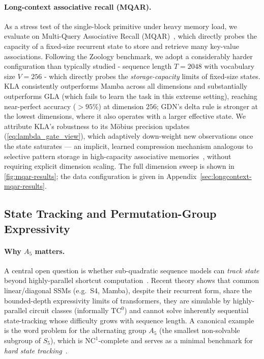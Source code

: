 \documentclass{article}
\begin{document}
\paragraph{Long-context associative recall (MQAR).}
As a stress test of the single-block primitive under heavy memory load, we evaluate on Multi-Query Associative Recall (MQAR)~\citep{arora2023zoology}, which directly probes the capacity of a fixed-size recurrent state to store and retrieve many key-value associations.
Following the Zoology benchmark, we adopt a considerably harder configuration than typically studied - sequence length $T{=}2048$ with vocabulary size $V{=}256$ - which directly probes the \emph{storage-capacity} limits of fixed-size states.
\textsc{KLA} consistently outperforms Mamba across all dimensions and substantially outperforms GLA (which fails to learn the task in this extreme setting), reaching near-perfect accuracy ($>95\%$) at dimension $256$; GDN's delta rule is stronger at the lowest dimensions, where it also operates with a larger effective state.
We attribute \textsc{KLA}'s robustness to its M\"{o}bius precision updates (\cref{eq:lambda_gate_view}), which adaptively down-weight new observations once the state saturates --- an implicit, learned compression mechanism analogous to selective pattern storage in high-capacity associative memories~\citep{storkey1997hopfield}, without requiring explicit dimension scaling. The full dimension sweep is shown in \cref{fig:mqar-results}; the data configuration is given in Appendix~\ref{sec:longcontext-mqar-results}.

\subsection{State Tracking and Permutation-Group Expressivity}
\label{sec:a5-expressivity}

\paragraph{Why $A_5$ matters.}
A central open question is whether sub-quadratic sequence models can \emph{track state} beyond highly-parallel shortcut computation~\citep{merrill2023parallelism,merrill2024illusion}. Recent theory shows that common linear/diagonal SSMs (e.g.\ S4, Mamba), despite their recurrent form, share the bounded-depth expressivity limits of transformers, they are simulable by highly-parallel circuit classes (informally $\mathrm{TC}^0$) and cannot solve inherently sequential state-tracking whose difficulty grows with sequence length. A canonical example is the word problem for the alternating group $A_5$ (the smallest non-solvable subgroup of $S_5$), which is $\mathrm{NC}^1$-complete and serves as a minimal benchmark for \emph{hard state tracking}~\citep{merrill2024illusion}.
\end{document}
